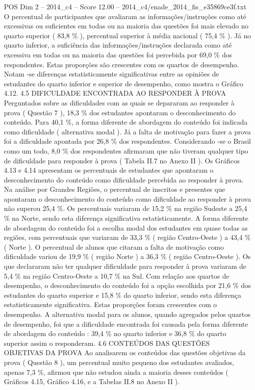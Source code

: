 \begin{textsample}{POS Dim 2 – 2014\_c4 – Score 12.00 – 2014\_c4/enade\_2014\_fis\_e35869ce3f.txt}
O percentual de participantes que avaliaram as informações/instruções como até excessivas ou suficientes em todas ou na maioria das questões foi mais elevado no quarto superior ( 83,8 \% ), percentual superior à média nacional ( 75,4 \% ).
Já no quarto inferior, a suficiência das informações/instruções declarada como até excessiva em todas ou na maioria das questões foi percebida por 69,0 \% dos respondentes.
Estas proporções são crescentes com os quartos de desempenho.
Notam -se diferenças estatisticamente significativas entre as opiniões de estudantes do quarto inferior e superior de desempenho, como mostra o Gráfico 4.12. 4.5 DIFICULDADE ENCONTRADA AO RESPONDER À PROVA Perguntados sobre as dificuldades com as quais se depararam ao responder à prova ( Questão 7 ), 18,3 \% dos estudantes apontaram o desconhecimento do conteúdo.
Para 40,1 \%, a forma diferente de abordagem do conteúdo foi indicada como dificuldade ( alternativa modal ).
Já a falta de motivação para fazer a prova foi a dificuldade apontada por 26,8 \% dos respondentes.
Considerando -se o Brasil como um todo, 8,0 \% dos respondentes afirmaram que não tiveram qualquer tipo de dificuldade para responder à prova ( Tabela II.7 no Anexo II ).
Os Gráficos 4.13 e 4.14 apresentam os percentuais de estudantes que apontaram o desconhecimento do conteúdo como dificuldade percebida ao responder à prova.
Na análise por Grandes Regiões, o percentual de inscritos e presentes que apontaram o desconhecimento do conteúdo como dificuldade ao responder à prova não superou 25,4 \%.
Os percentuais variaram de 15,2 \% na região Sudeste a 25,4 \% na Norte, sendo esta diferença significativa estatisticamente.
A forma diferente de abordagem do conteúdo foi a escolha modal dos estudantes em quase todas as regiões, com percentuais que variaram de 33,3 \% ( região Centro-Oeste ) a 43,4 \% ( Norte ).
O percentual de alunos que citaram a falta de motivação como dificuldade variou de 19,9 \% ( região Norte ) a 36,3 \% ( região Centro-Oeste ).
Os que declararam não ter qualquer dificuldade para responder à prova variaram de 5,4 \% na região Centro-Oeste a 10,7 \% na Sul.
Com relação aos quartos de desempenho, o desconhecimento do conteúdo foi a opção escolhida por 21,6 \% dos estudantes do quarto superior e 15,8 \% do quarto inferior, sendo esta diferença estatisticamente significativa.
Estas proporções foram crescentes com o desempenho.
A alternativa modal para os alunos, quando agregados pelos quartos de desempenho, foi que a dificuldade encontrada foi causada pela forma diferente de abordagem do conteúdo : 39,4 \% no quarto inferior e 36,8 \% do quarto superior assim o responderam. 4.6 CONTEÚDOS DAS QUESTÕES OBJETIVAS DA PROVA Ao analisarem os conteúdos das questões objetivas da prova ( Questão 8 ), um percentual muito pequeno dos estudantes avaliados, apenas 7,3 \%, afirmou que não estudou ainda a maioria desses conteúdos ( Gráficos 4.15, Gráfico 4.16, e a Tabelas II.8 no Anexo II ).

\end{textsample}
